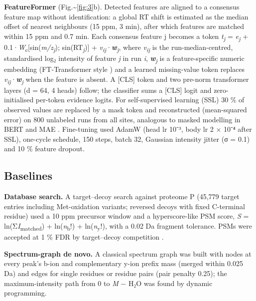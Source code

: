 \documentclass[pdflatex,sn-mathphys-num]{sn-jnl}
\begin{document}
\textbf{FeatureFormer} (Fig.\textasciitilde{}\ref{fig:3}b). Detected features are aligned to a consensus feature map without identification: a global RT shift is estimated as the median offset of nearest neighbours (15 ppm, 3 min), after which features are matched within 15 ppm and 0.7 min. Each consensus feature j becomes a token \emph{t}\textsubscript{\emph{j}} = \emph{e}\textsubscript{\emph{j}} + 0.1·\emph{W}\textsubscript{c}{[}sin(\emph{m/z}\textsubscript{\emph{j}}); sin(RT\textsubscript{\emph{j}}){]} + \emph{v}\textsubscript{\emph{ij}}·\textbf{\emph{w}}\textsubscript{\emph{j}}, where \emph{v}\textsubscript{\emph{ij}} is the run-median-centred, standardised log₂ intensity of feature \emph{j} in run \emph{i}, \textbf{\emph{w}}\textsubscript{\emph{j}} is a feature-specific numeric embedding (FT-Transformer style \cite{gorishniy2021}) and a learned missing-value token replaces \emph{v}\textsubscript{\emph{ij}}·\textbf{\emph{w}}\textsubscript{\emph{j}} when the feature is absent. A {[}CLS{]} token and two pre-norm transformer layers (d = 64, 4 heads) follow; the classifier sums a {[}CLS{]} logit and zero-initialised per-token evidence logits. For self-supervised learning (SSL) 30 \% of observed values are replaced by a mask token and reconstructed (mean-squared error) on 800 unlabeled runs from all sites, analogous to masked modelling in BERT and MAE \cite{devlin2019,he2022}. Fine-tuning used AdamW (head lr 10⁻³, body lr 2 × 10⁻⁴ after SSL), one-cycle schedule, 150 steps, batch 32, Gaussian intensity jitter (σ = 0.1) and 10 \% feature dropout.

\subsection{Baselines}

\textbf{Database search.} A target--decoy search against proteome P (45,779 target entries including Met-oxidation variants; reversed decoys with fixed C-terminal residue) used a 10 ppm precursor window and a hyperscore-like PSM score, \emph{S} = ln(Σ\emph{I}\textsubscript{matched}) + ln(\emph{n}\textsubscript{b}!) + ln(\emph{n}\textsubscript{y}!), with a 0.02 Da fragment tolerance. PSMs were accepted at 1 \% FDR by target--decoy competition \cite{elias2007}.

\textbf{Spectrum-graph de novo.} A classical spectrum graph \cite{dancik1999,ma2003} was built with nodes at every peak's b-ion and complementary y-ion prefix mass (merged within 0.025 Da) and edges for single residues or residue pairs (pair penalty 0.25); the maximum-intensity path from 0 to \emph{M} − H₂O was found by dynamic programming.
\end{document}

